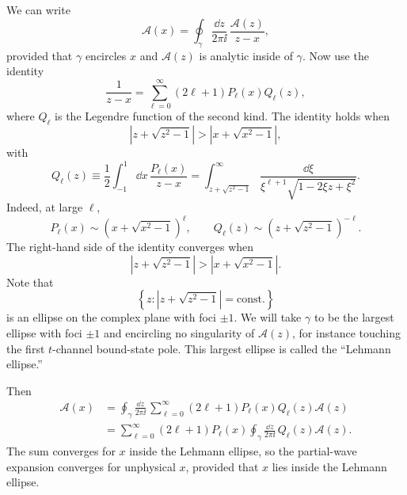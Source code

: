 We can write
\[
  \mathcal A(x)
  =
  \oint_\gamma \frac{\dd z}{2\pi\ii}\,
  \frac{\mathcal A(z)}{z-x},
\]
provided that \(\gamma\) encircles \(x\) and \(\mathcal A(z)\) is
analytic inside of \(\gamma\).  Now use the identity
\[
  \frac{1}{z-x}
  =
  \sum_{\ell=0}^{\infty}
  (2\ell+1)P_\ell(x)Q_\ell(z),
\]
where \(Q_\ell\) is the Legendre function of the second kind.  The
identity holds when
\[
  \left|z+\sqrt{z^2-1}\right|
  >
  \left|x+\sqrt{x^2-1}\right|,
\]
with
\[
  Q_\ell(z)
  \equiv
  \frac12\int_{-1}^{1}\dd x\,
  \frac{P_\ell(x)}{z-x}
  =
  \int_{z+\sqrt{z^2-1}}^\infty
  \frac{\dd\xi}{\xi^{\ell+1}\sqrt{1-2\xi z+\xi^2}} .
\]
Indeed, at large \(\ell\),
\[
  P_\ell(x)\sim\left(x+\sqrt{x^2-1}\right)^\ell,
  \qquad
  Q_\ell(z)\sim\left(z+\sqrt{z^2-1}\right)^{-\ell}.
\]
The right-hand side of the identity converges when
\[
  \left|z+\sqrt{z^2-1}\right|
  >
  \left|x+\sqrt{x^2-1}\right|.
\]
Note that
\[
  \left\{z:\left|z+\sqrt{z^2-1}\right|=\text{const.}\right\}
\]
is an ellipse on the complex plane with foci \(\pm1\).  We will take
\(\gamma\) to be the largest ellipse with foci \(\pm1\) and encircling no
singularity of \(\mathcal A(z)\), for instance touching the first
\(t\)-channel bound-state pole.  This largest ellipse is called the
``Lehmann ellipse.''

Then
\[
\begin{aligned}
  \mathcal A(x)
  &=
  \oint_\gamma \frac{\dd z}{2\pi\ii}\,
  \sum_{\ell=0}^{\infty}
  (2\ell+1)P_\ell(x)Q_\ell(z)\mathcal A(z)  \\
  &=
  \sum_{\ell=0}^{\infty}
  (2\ell+1)P_\ell(x)
  \oint_\gamma \frac{\dd z}{2\pi\ii}\,
  Q_\ell(z)\mathcal A(z).
\end{aligned}
\]
The sum converges for \(x\) inside the Lehmann ellipse, so the
partial-wave expansion converges for unphysical \(x\), provided that
\(x\) lies inside the Lehmann ellipse.

\begin{center}
\end{center}

